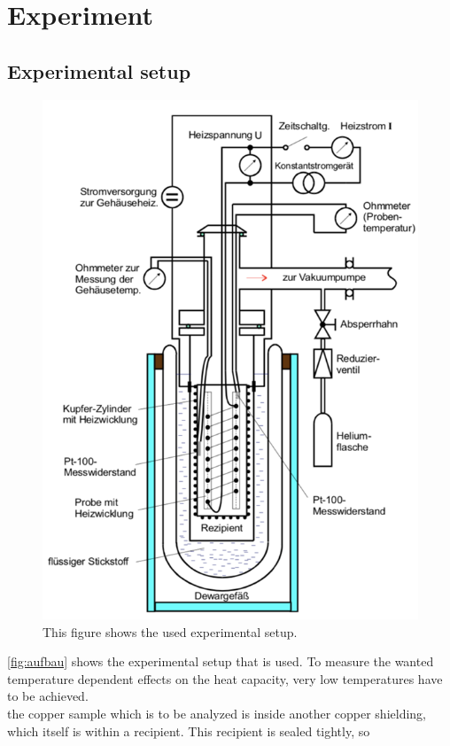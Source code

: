 \chapter{Experiment}
\label{cha:experiment}
\section{Experimental setup}
\begin{figure}
    \centering
    \includegraphics[scale=0.4]{content/V47_pictures/Aufbau.png}
    \caption{This figure shows the used experimental setup. \cite{v47}}
    \label{fig:aufbau}
\end{figure}
\autoref{fig:aufbau} shows the experimental setup that is used. To measure the wanted temperature dependent effects 
on the heat capacity, very low temperatures have to be achieved. \\
the copper sample which is to be analyzed is inside another copper shielding, which itself is within a recipient. This recipient is sealed tightly, so
